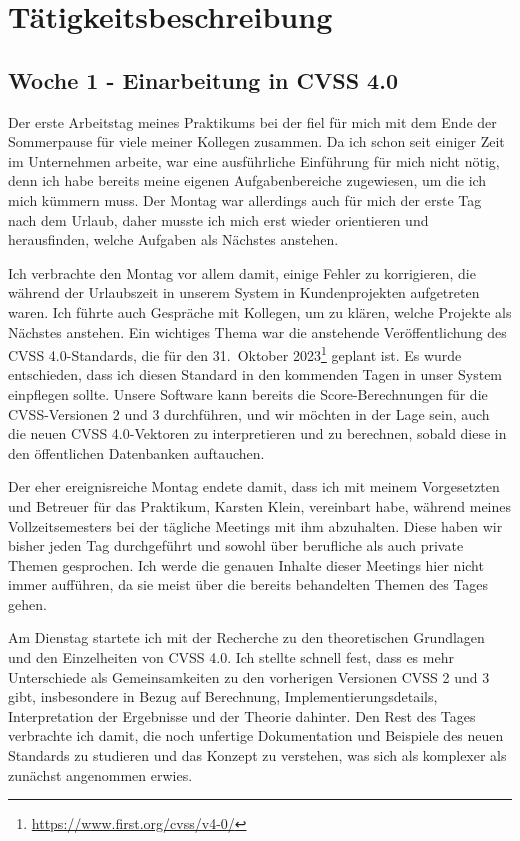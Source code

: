 

\chapter{Tätigkeitsbeschreibung} \label{ch:wochenberichte}


\section{Woche 1 - Einarbeitung in CVSS 4.0} \label{sec:bericht-wo-1}

Der erste Arbeitstag meines Praktikums bei der \metaeffekt fiel für mich mit dem Ende der Sommerpause für viele meiner Kollegen zusammen.
Da ich schon seit einiger Zeit im Unternehmen arbeite, war eine ausführliche Einführung für mich nicht nötig, denn ich habe bereits meine eigenen Aufgabenbereiche zugewiesen, um die ich mich kümmern muss.
Der Montag war allerdings auch für mich der erste Tag nach dem Urlaub, daher musste ich mich erst wieder orientieren und herausfinden, welche Aufgaben als Nächstes anstehen.

Ich verbrachte den Montag vor allem damit, einige Fehler zu korrigieren, die während der Urlaubszeit in unserem System in Kundenprojekten aufgetreten waren.
Ich führte auch Gespräche mit Kollegen, um zu klären, welche Projekte als Nächstes anstehen.
Ein wichtiges Thema war die anstehende Veröffentlichung des CVSS 4.0-Standards, die für den 31.\ Oktober 2023\footnote{\url{https://www.first.org/cvss/v4-0/}} geplant ist.
Es wurde entschieden, dass ich diesen Standard in den kommenden Tagen in unser System einpflegen sollte.
Unsere Software kann bereits die Score-Berechnungen für die CVSS-Versionen 2 und 3 durchführen, und wir möchten in der Lage sein, auch die neuen CVSS 4.0-Vektoren zu interpretieren und zu berechnen, sobald diese in den öffentlichen Datenbanken auftauchen.

Der eher ereignisreiche Montag endete damit, dass ich mit meinem Vorgesetzten und Betreuer für das Praktikum, Karsten Klein, vereinbart habe, während meines Vollzeitsemesters bei der \metaeffekt tägliche Meetings mit ihm abzuhalten.
Diese haben wir bisher jeden Tag durchgeführt und sowohl über berufliche als auch private Themen gesprochen.
Ich werde die genauen Inhalte dieser Meetings hier nicht immer aufführen, da sie meist über die bereits behandelten Themen des Tages gehen.

Am Dienstag startete ich mit der Recherche zu den theoretischen Grundlagen und den Einzelheiten von CVSS 4.0.
Ich stellte schnell fest, dass es mehr Unterschiede als Gemeinsamkeiten zu den vorherigen Versionen CVSS 2 und 3 gibt, insbesondere in Bezug auf Berechnung, Implementierungsdetails, Interpretation der Ergebnisse und der Theorie dahinter.
Den Rest des Tages verbrachte ich damit, die noch unfertige Dokumentation und Beispiele des neuen Standards zu studieren und das Konzept zu verstehen, was sich als komplexer als zunächst angenommen erwies.

